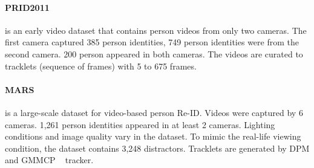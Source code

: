 \documentclass[a4paper,fleqn]{cas-dc}
\begin{document}
\begin{table} [t]
\begin{center}
\caption{Commonly used benchmark datasets for unsupervised person re-identification. The top four datasets are for image-based person Re-ID, the bottom four are for video-based person Re-ID.}
\label{table:datasets}

\label{table:image-datasets}
\end{center}
\end{table}

\paragraph{PRID2011~\cite{hirzer_person_2011}} is an early video dataset that contains person videos from only two cameras. The first camera captured 385 person identities, 749 person identities were from the second camera. 200 person appeared in both cameras. The videos are curated to tracklets (sequence of frames) with 5 to 675 frames. 

\paragraph{MARS~\cite{zheng_scalable_2015}} is a large-scale dataset for video-based person Re-ID. Videos were captured by 6 cameras. 1,261 person identities appeared in at least 2 cameras. Lighting conditions and image quality vary in the dataset. To mimic the real-life viewing condition, the dataset contains 3,248 distractors. Tracklets are generated by DPM and GMMCP ~\cite{dehghan_gmmcp_2015} tracker.
\end{document}
